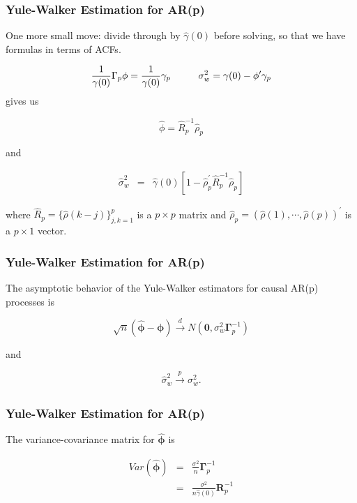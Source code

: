 \documentclass[%
xcolor=pdftex]{beamer}
\begin{document}
\begin{frame}
\frametitle{Yule-Walker Estimation for AR(p)}

One more small move: divide through by $\hat{\gamma}(0)$ before solving, so that we have formulas in terms of ACFs.
\newline

$$
\frac{1}{\gamma(0)} \Gamma_p \phi = \frac{1}{\gamma(0)}\gamma_p \hspace{10mm} \sigma^2_w = \gamma(0) - \phi' \gamma_p
$$
gives us

\begin{equation} \label{eq:s1}
\hat{\phi} = \hat{R}_p^{-1} \hat{\rho}_p
\end{equation}

and

\begin{eqnarray} \label{eq:s2}
\hat{\sigma}_w^2 &=& \hat{\gamma}(0) \left[ 1 - \hat{\rho}_p^{\prime} \hat{R}_p^{-1} \hat{\rho}_p \right] \nonumber 
\end{eqnarray}

where $\hat{R}_p = \{\hat{\rho}(k-j) \}_{j,k=1}^p$ is a $p \times p$ matrix and $\hat{\rho}_p = (\hat{\rho}(1), \cdots, \hat{\rho}(p))^{\prime}$ is a $p \times 1$ vector.

\end{frame}

\begin{frame}
\frametitle{Yule-Walker Estimation for AR(p)}

The asymptotic behavior of the Yule-Walker estimators for causal AR(p) processes is

\begin{equation} \label{eq:asymp}
\sqrt{n}\left(\hat{\bm{\phi}} - \bm{\phi}\right) \xrightarrow[]{d} N\left( \bm{0}, \sigma_w^2 \bm{\Gamma}_p^{-1} \right)
\end{equation}

and

\begin{equation*}
\hat{\sigma}_w^2 \xrightarrow[]{p} \sigma_w^2.
\end{equation*}

\end{frame}

\begin{frame}
\frametitle{Yule-Walker Estimation for AR(p)}

The variance-covariance matrix for $\hat{\bm{\phi}}$ is

\begin{eqnarray} \label{eq:varmatrix}
Var(\hat{\bm{\phi}}) &=& \frac{\sigma^2}{n} \bm{\Gamma}_p^{-1} \nonumber \\
                     &=& \frac{\sigma^2}{n\hat{\gamma}(0)}  \bm{R}_p^{-1}
\end{eqnarray}

\end{frame}
\end{document}
